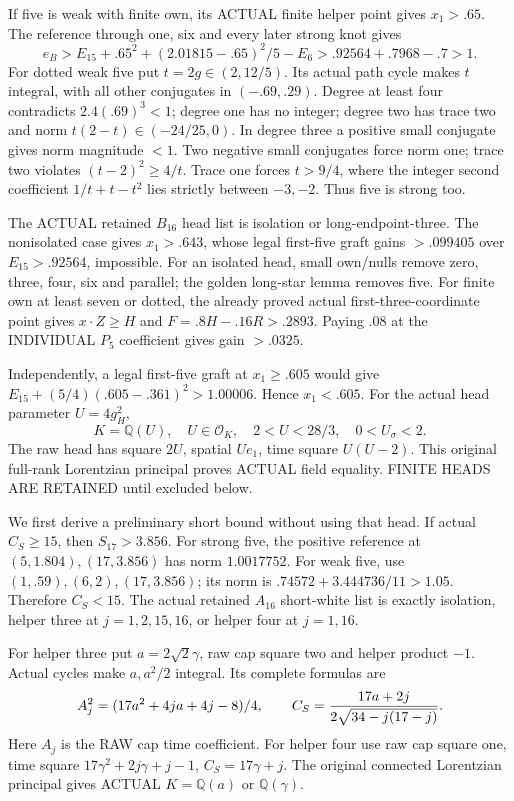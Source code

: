 If five is weak with finite own, its ACTUAL
finite helper point gives \(x_1>.65\).
The reference through one, six and every later
strong knot gives
\[
 e_B>E_{15}+.65^2+(2.01815-.65)^2/5-E_6
                       >.92564+.7968-.7>1 .
\]
For dotted weak five put \(t=2g\in(2,12/5)\).
Its actual path cycle makes \(t\) integral,
with all other conjugates in \((-.69,.29)\).
Degree at least four contradicts
\(2.4(.69)^3<1\); degree one has no integer;
degree two has trace two and norm
\(t(2-t)\in(-24/25,0)\).
In degree three a positive small conjugate gives
norm magnitude \(<1\).
Two negative small conjugates force norm one;
trace two violates \((t-2)^2\ge4/t\).
Trace one forces \(t>9/4\), where the integer
second coefficient \(1/t+t-t^2\) lies strictly
between \(-3,-2\).
Thus five is strong too.

The ACTUAL retained \(B_{16}\) head list is
isolation or long-endpoint-three.
The nonisolated case gives \(x_1>.643\),
whose legal first-five graft gains \(>.099405\)
over \(E_{15}>.92564\), impossible.
For an isolated head, small own/nulls remove
zero, three, four, six and parallel;
the golden long-star lemma removes five.
For finite own at least seven or dotted, the
already proved actual first-three-coordinate
point gives \(x\cdot Z\ge H\) and
\(F=.8H-.16R>.2893\).
Paying \(.08\) at the INDIVIDUAL \(P_5\)
coefficient gives gain \(>.0325\).

Independently, a legal first-five graft at
\(x_1\ge.605\) would give
\(E_{15}+(5/4)(.605-.361)^2>1.00006\).
Hence \(x_1<.605\).
For the actual head parameter \(U=4g_H^2\),
\[
 K=\mathbb Q(U),\quad U\in\mathcal O_K,\quad
               2<U<28/3,\quad0<U_\sigma<2 .
\]
The raw head has square \(2U\), spatial \(Ue_1\),
time square \(U(U-2)\).
This original full-rank Lorentzian principal
proves ACTUAL field equality.
FINITE HEADS ARE RETAINED until excluded below.

We first derive a preliminary short bound without
using that head.
If actual \(C_S\ge15\), then \(S_{17}>3.856\).
For strong five, the positive reference at
\((5,1.804),(17,3.856)\) has norm \(1.0017752\).
For weak five, use \((1,.59),(6,2),(17,3.856)\);
its norm is \(.74572+3.444736/11>1.05\).
Therefore \(C_S<15\).
The actual retained \(A_{16}\) short-white list
is exactly isolation, helper three at
\(j=1,2,15,16\), or helper four at \(j=1,16\).

For helper three put \(a=2\sqrt2\gamma\),
raw cap square two and helper product \(-1\).
Actual cycles make \(a,a^2/2\) integral.
Its complete formulas are
\[
 A_j^2=(17a^2+4ja+4j-8)/4,\qquad
 C_S={17a+2j\over2\sqrt{34-j(17-j)}} .
\]
Here \(A_j\) is the RAW cap time coefficient.
For helper four use raw cap square one,
time square \(17\gamma^2+2j\gamma+j-1\),
\(C_S=17\gamma+j\).
The original connected Lorentzian principal gives
ACTUAL \(K=\mathbb Q(a)\) or \(\mathbb Q(\gamma)\).

